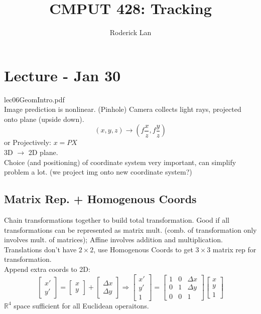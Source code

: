 \documentclass{article}
\title{CMPUT 428: Tracking}
\author{Roderick Lan}
\date{}
\begin{document}
\maketitle
\tableofcontents
\break

\section{Lecture - Jan 30}
lec06GeomIntro.pdf\\
Image prediction is nonlinear.
(Pinhole) Camera collects light rays, projected onto plane (upside down).
\[
    (x,y,z ) \to \left ( f\frac{x}{z}, f \frac{y}{z}\right )
\]
or Projectively: $x = PX$\\
3D $\to$ 2D plane.\\
Choice (and positioning) of coordinate system very important, 
can simplify problem a lot. (we project img onto new coordinate system?)

\subsection{Matrix Rep. + Homogenous Coords}
Chain transformations together to build total transformation.
Good if all transformations can be represented as matrix mult. 
(comb. of transformation only involves mult. of matrices); Affine 
involves addition and multiplication. Translations don't have $2\times 2$, 
use Homogenous Coords to get $3\times 3$ matrix rep for transformation. 
\\
Append extra coords to 2D:
\[
    \begin{bmatrix}
        x' \\ y'
    \end{bmatrix} = \begin{bmatrix}
        x \\ y
    \end{bmatrix} + \begin{bmatrix}
        \Delta x \\ \Delta y
    \end{bmatrix}
    \Rightarrow
    \begin{bmatrix}
        x'\\
        y'\\
        1
    \end{bmatrix} = 
    \begin{bmatrix}
        1 & 0 & \Delta x\\
        0 & 1 & \Delta y\\
        0 & 0 & 1
    \end{bmatrix} \begin{bmatrix}
        x\\y\\1
    \end{bmatrix}
\]
$\mathbb R^4$ space sufficient for all Euclidean operaitons. 
\end{document}
